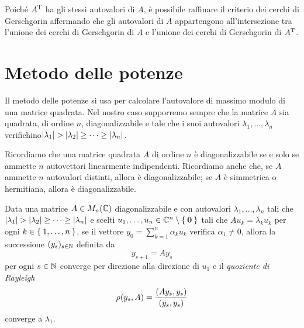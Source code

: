 	\begin{osservazione}
		Poiché \(A^\mathrm{T}\relax\) ha gli stessi autovalori di \(A\), è possibile raffinare il criterio dei cerchi di Gerschgorin affermando che gli autovalori di \(A\) appartengono all'intersezione tra l'unione dei cerchi di Gerschgorin di \(A\) e l'unione dei cerchi di Gerschgorin di \(A^\mathrm{T}\relax\).
	\end{osservazione}

\section{Metodo delle potenze}
	
	\noindent Il metodo delle potenze si usa per calcolare l'autovalore di massimo modulo di una matrice quadrata. Nel nostro caso supporremo sempre che la matrice \(A\) sia quadrata, di ordine \(n\), diagonalizzabile e tale che i suoi autovalori \(\lambda_1, \dots, \lambda_n\) verifichino\(\abs{\lambda_1} > \abs{\lambda_2} \ge \dots \ge \abs{\lambda_n}\).
	
	Ricordiamo che una matrice quadrata \(A\) di ordine \(n\) è diagonalizzabile se e solo se ammette \(n\) autovettori linearmente indipendenti. Ricordiamo anche che, se \(A\) ammette \(n\) autovalori distinti, allora è diagonalizzabile; se \(A\) è simmetrica o hermitiana, allora è diagonalizzabile.
	
	\begin{teorema}\label{th:metodo-potenze-converge}
		Data una matrice \(A \in M_n (\mathbb{C})\) diagonalizzabile e con autovalori \(\lambda_1, \dots, \lambda_n\) tali che \(\abs{\lambda_1} > \abs{\lambda_2} \ge \dots \ge \abs{\lambda_n}\) e scelti \(u_1, \dots, u_n \in \mathbb{C}^n \setminus \Set{\mathbf{0}}\) tali che \(A u_k = \lambda_k u_k\) per ogni \(k \in \Set{1, \dots, n}\), se il vettore \(y_0 = \sum_{k = 1}^n \alpha_k u_k\) verifica \(\alpha_1 \ne 0\), allora la successione \((y_s)_{s \in \mathbb{N}}\) definita da
		\begin{equation}
			y_{s + 1} = A y_s
		\end{equation}
		per ogni \(s \in \mathbb{N}\) converge per direzione alla direzione di \(u_1\) e il \emph{quoziente di Rayleigh}
		\begin{equation}
			\operatorname{\rho} (y_s, A) = \frac{(A y_s, y_s)}{(y_s, y_s)}
		\end{equation}
		converge a \(\lambda_1\).
	\end{teorema}

